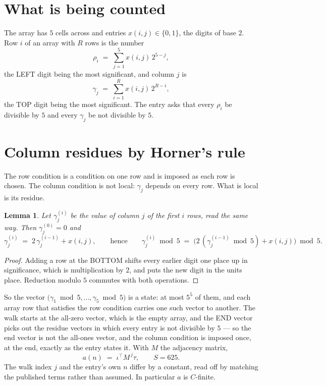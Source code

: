 \documentclass[11pt,a4paper]{article}
\theoremstyle{plain}
\newtheorem{lemma}[theorem]{Lemma}
\theoremstyle{definition}
\begin{document}
\section{What is being counted}

The array has $5$ cells across and entries $x(i,j)\in\{0,1\}$, the digits of
base $2$. Row $i$ of an array with $R$ rows is the number
\[
\rho_i\;=\;\sum_{j=1}^{5}x(i,j)\,2^{5-j} ,
\]
the LEFT digit being the most significant, and column $j$ is
\[
\gamma_j\;=\;\sum_{i=1}^{R}x(i,j)\,2^{R-i} ,
\]
the TOP digit being the most significant. The entry asks that every $\rho_i$ be divisible by
$5$ and every $\gamma_j$ be not divisible by $5$.


\section{Column residues by Horner's rule}

The row condition is a condition on one row and is imposed as each row is chosen. The column
condition is not local: $\gamma_j$ depends on every row. What is local is its residue.

\begin{lemma}\label{lem:horner}
Let $\gamma_j^{(i)}$ be the value of column $j$ of the first $i$ rows, read the same way.
Then $\gamma_j^{(0)}=0$ and
\[
\gamma_j^{(i)}\;=\;2\,\gamma_j^{(i-1)}+x(i,j),
\qquad\text{hence}\qquad
\gamma_j^{(i)}\bmod 5\;=\;
\bigl(2\,(\gamma_j^{(i-1)}\bmod 5)+x(i,j)\bigr)\bmod 5 .
\]
\end{lemma}

\begin{proof}
Adding a row at the BOTTOM shifts every earlier digit one place up in significance, which is
multiplication by $2$, and puts the new digit in the units place. Reduction modulo
$5$ commutes with both operations.
\end{proof}

So the vector $\bigl(\gamma_1\bmod 5,\dots,\gamma_{5}\bmod
5\bigr)$ is a state: at most $5^{5}$ of them, and each array row
that satisfies the row condition carries one such vector to another. The walk starts at the
all-zero vector, which is the empty array, and the END vector picks out the residue vectors in
which every entry is not divisible by $5$ --- so the end vector is not the all-ones
vector, and the column condition is imposed once, at the end, exactly as the entry states it.
With $M$ the adjacency matrix,
\[
a(n)\;=\;\iota^{\!\top}M^{\,j}\tau ,\qquad S=625.
\]
The walk index $j$ and the entry's own $n$ differ by a constant, read off by matching the
published terms rather than assumed. In particular $a$ is $C$-finite.
\end{document}
